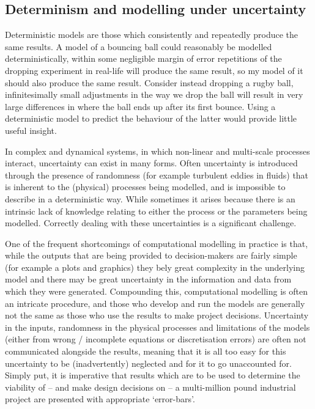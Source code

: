 \subsection{Determinism and modelling under uncertainty} 

Deterministic models are those
which consistently and repeatedly produce the same results. A model of a
bouncing ball could reasonably be modelled deterministically, within some
negligible margin of error repetitions of the dropping experiment in real-life
will produce the same result, so my model of it should also produce the same
result. Consider instead dropping a rugby ball, infinitesimally small
adjustments in the way we drop the ball will result in very large differences
in where the ball ends up after its first bounce. Using a deterministic model
to predict the behaviour of the latter would provide little useful insight.

In complex and dynamical systems, in which non-linear and multi-scale processes
interact, uncertainty can exist in many forms. Often uncertainty is introduced
through the presence of randomness (for example turbulent eddies in fluids)
that is inherent to the (physical) processes being modelled, and is impossible
to describe in a deterministic way. While sometimes it arises because there is
an intrinsic lack of knowledge relating to either the process or the parameters
being modelled. Correctly dealing with these uncertainties is a significant
challenge.

One of the frequent shortcomings of computational modelling in practice is
that, while the outputs that are being provided to decision-makers are fairly
simple (for example a plots and graphics) they bely great complexity in the
underlying model and there may be great uncertainty in the information and data
from which they were generated. Compounding this, computational modelling is
often an intricate procedure, and those who develop and run the models are
generally not the same as those who use the results to make project decisions.
Uncertainty in the inputs, randomness in the physical processes and limitations
of the models (either from wrong / incomplete equations or discretisation
errors) are often not communicated alongside the results, meaning that it is
all too easy for this uncertainty to be (inadvertently) neglected and for it to
go unaccounted for. Simply put, it is imperative that results which are to be
used to determine the viability of – and make design decisions on – a
multi-million pound industrial project are presented with appropriate
‘error-bars’.

